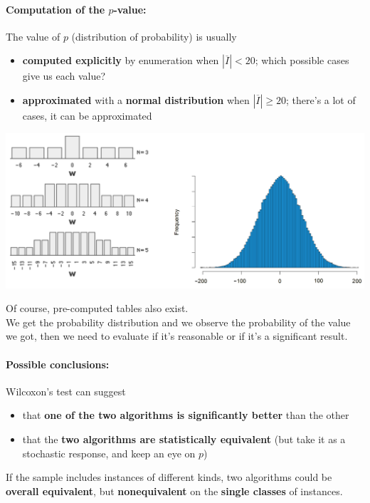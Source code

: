 \newpage

\paragraph{Computation of the $p$-value:} The value of $p$ (distribution of probability) is usually
\begin{itemize}
	\item \textbf{computed explicitly} by enumeration when $|\overline{I}| < 20$; which possible cases give us each value?
	\item \textbf{approximated} with a \textbf{normal distribution} when $|\overline{I}| \geq 20$; there's a lot of cases, it can be approximated
\end{itemize}
\begin{center}
	\includegraphics[width=\columnwidth]{img/pval1}
\end{center}
Of course, pre-computed tables also exist.\\

We get the probability distribution and we observe the probability of the value we got, then we need to evaluate if it's reasonable or if it's a significant result. \\

\newpage

\paragraph{Possible conclusions:} Wilcoxon's test can suggest
\begin{itemize}
	\item that \textbf{one of the two algorithms is significantly better} than the other
	\item that the \textbf{two algorithms are statistically equivalent} (but take it as a stochastic response, and keep an eye on $p$)
\end{itemize}

If the sample includes instances of different kinds, two algorithms could be \textbf{overall equivalent}, but \textbf{nonequivalent} on the \textbf{single classes} of instances.\\

